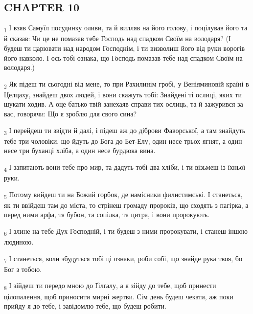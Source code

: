 \subsection{CHAPTER 10}
\begin{tcolorbox}
\textsubscript{1} І взяв Самуїл посудинку оливи, та й вилляв на його голову, і поцілував його та й сказав: Чи це не помазав тебе Господь над спадком Своїм на володаря? (І будеш ти царювати над народом Господнім, і ти визволиш його від руки ворогів його навколо. І ось тобі ознака, що Господь помазав тебе над спадком Своїм на володаря.)
\end{tcolorbox}
\begin{tcolorbox}
\textsubscript{2} Як підеш ти сьогодні від мене, то при Рахилинім гробі, у Веніяминовій країні в Целцаху, знайдеш двох людей, і вони скажуть тобі: Знайдені ті ослиці, яких ти шукати ходив. А оце батько твій занехаяв справи тих ослиць, та й зажурився за вас, говорячи: Що я зроблю для свого сина?
\end{tcolorbox}
\begin{tcolorbox}
\textsubscript{3} І перейдеш ти звідти й далі, і підеш аж до діброви Фаворської, а там знайдуть тебе три чоловіки, що йдуть до Бога до Бет-Елу, один несе трьох ягнят, а один несе три буханці хліба, а один несе бурдюка вина.
\end{tcolorbox}
\begin{tcolorbox}
\textsubscript{4} І запитають вони тебе про мир, та дадуть тобі два хліби, і ти візьмеш із їхньої руки.
\end{tcolorbox}
\begin{tcolorbox}
\textsubscript{5} Потому вийдеш ти на Божий горбок, де намісники филистимські. І станеться, як ти ввійдеш там до міста, то стрінеш громаду пророків, що сходять з пагірка, а перед ними арфа, та бубон, та сопілка, та цитра, і вони пророкують.
\end{tcolorbox}
\begin{tcolorbox}
\textsubscript{6} І злине на тебе Дух Господній, і ти будеш з ними пророкувати, і станеш іншою людиною.
\end{tcolorbox}
\begin{tcolorbox}
\textsubscript{7} І станеться, коли збудуться тобі ці ознаки, роби собі, що знайде рука твоя, бо Бог з тобою.
\end{tcolorbox}
\begin{tcolorbox}
\textsubscript{8} І зійдеш ти передо мною до Ґілґалу, а я зійду до тебе, щоб принести цілопалення, щоб приносити мирні жертви. Сім день будеш чекати, аж поки прийду я до тебе, і завідомлю тебе, що будеш робити.
\end{tcolorbox}
